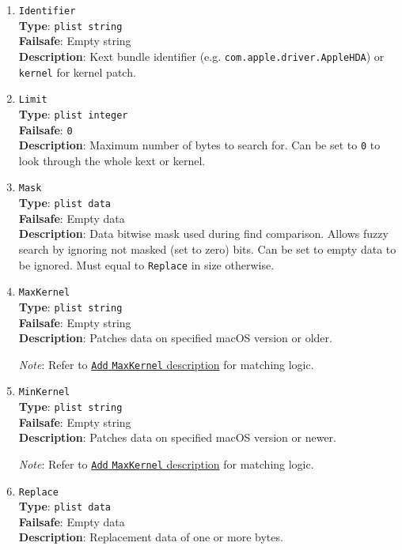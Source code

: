 \documentclass[]{article}
\begin{document}
\begin{enumerate}
\item
  \texttt{Identifier}\\
  \textbf{Type}: \texttt{plist\ string}\\
  \textbf{Failsafe}: Empty string\\
  \textbf{Description}: Kext bundle identifier (e.g. \texttt{com.apple.driver.AppleHDA})
  or \texttt{kernel} for kernel patch.

\item
  \texttt{Limit}\\
  \textbf{Type}: \texttt{plist\ integer}\\
  \textbf{Failsafe}: \texttt{0}\\
  \textbf{Description}: Maximum number of bytes to search for. Can be set to
  \texttt{0} to look through the whole kext or kernel.

\item
  \texttt{Mask}\\
  \textbf{Type}: \texttt{plist\ data}\\
  \textbf{Failsafe}: Empty data\\
  \textbf{Description}: Data bitwise mask used during find comparison.
  Allows fuzzy search by ignoring not masked (set to zero) bits. Can be
  set to empty data to be ignored. Must equal to \texttt{Replace} in size
  otherwise.

\item
  \texttt{MaxKernel}\\
  \textbf{Type}: \texttt{plist\ string}\\
  \textbf{Failsafe}: Empty string\\
  \textbf{Description}: Patches data on specified macOS version or older.

  \emph{Note}: Refer to \hyperlink{kernmatch}{\texttt{Add} \texttt{MaxKernel} description} for matching logic.

\item
  \texttt{MinKernel}\\
  \textbf{Type}: \texttt{plist\ string}\\
  \textbf{Failsafe}: Empty string\\
  \textbf{Description}: Patches data on specified macOS version or newer.

  \emph{Note}: Refer to \hyperlink{kernmatch}{\texttt{Add} \texttt{MaxKernel} description} for matching logic.

\item
  \texttt{Replace}\\
  \textbf{Type}: \texttt{plist\ data}\\
  \textbf{Failsafe}: Empty data\\
  \textbf{Description}: Replacement data of one or more bytes.


\end{enumerate}
\end{document}
